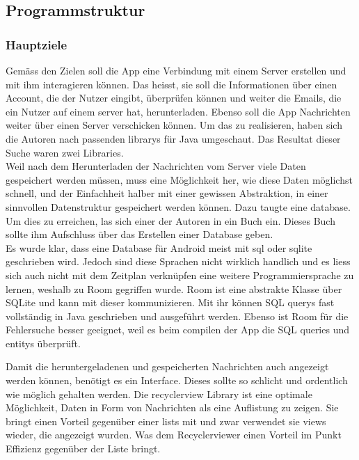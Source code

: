 \documentclass[a4paper,11pt]{article}
\begin{document}
\subsection{Programmstruktur}

\subsubsection{Hauptziele}
Gemäss den Zielen soll die App eine Verbindung mit einem Server erstellen und mit ihm interagieren können. Das heisst, sie soll die Informationen über einen Account, die der 
Nutzer eingibt, überprüfen können und weiter die Emails, die ein Nutzer auf einem \gls{server} hat, herunterladen. Ebenso soll die App Nachrichten weiter über einen Server verschicken können. 
Um das zu realisieren, haben sich die Autoren nach passenden \glspl{library} für Java umgeschaut. Das Resultat dieser Suche waren zwei Libraries. \\



Weil nach dem Herunterladen der Nachrichten vom Server viele Daten gespeichert werden müssen, muss eine Möglichkeit her, wie diese Daten möglichst schnell, 
und der Einfachheit halber mit einer gewissen Abstraktion, in einer sinnvollen Datenstruktur gespeichert werden können. Dazu taugte eine \gls{database}. Um dies zu erreichen, 
las sich einer der Autoren in ein Buch ein. Dieses Buch sollte ihm Aufschluss über das Erstellen einer Database geben.  \\

Es wurde klar, dass eine Database für Android meist mit \gls{sql} oder \gls{sqlite} geschrieben wird. Jedoch sind diese Sprachen nicht wirklich handlich und es
liess sich auch nicht mit dem Zeitplan verknüpfen eine weitere Programmiersprache zu lernen, weshalb zu Room gegriffen wurde. Room ist eine abstrakte Klasse über SQLite 
und kann mit dieser kommunizieren. Mit ihr können SQL \glspl{query} fast vollständig in Java geschrieben und ausgeführt werden. Ebenso ist Room für die Fehlersuche besser geeignet, 
weil es beim compilen der App die SQL queries und \glspl{entity} überprüft. \cite{roomInfo} \\

\newpage

\begingroup
\setlength{\intextsep}{7pt}
\setlength{\columnsep}{15pt}


\nohyphenation

Damit die heruntergeladenen und gespeicherten Nachrichten auch angezeigt werden können, benötigt es ein Interface. Dieses sollte so schlicht und ordentlich wie möglich gehalten werden. 
Die \gls{recyclerview} Library ist eine optimale Möglichkeit, Daten in Form von Nachrichten als eine Auflistung zu zeigen. Sie bringt einen Vorteil gegenüber einer \glspl{list} mit und zwar
verwendet sie \glspl{view} wieder, die angezeigt wurden. Was dem Recyclerviewer einen Vorteil im Punkt Effizienz gegenüber der Liste bringt. \cite{recyclerViewRecycle}
\end{document}
